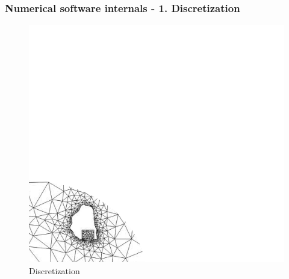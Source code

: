 \documentclass{beamer}
\begin{document}
\begin{frame}
\large
\frametitle{Numerical software internals - 1. Discretization}
\begin{figure}[!ht]
\vspace{-1mm}
\begin{center}
\includegraphics[height=0.8\textheight]{internals1.png}
\caption{Discretization}
\end{center}
\noindent
\vspace{-4mm}
\end{figure}
\end{frame}
\end{document}
